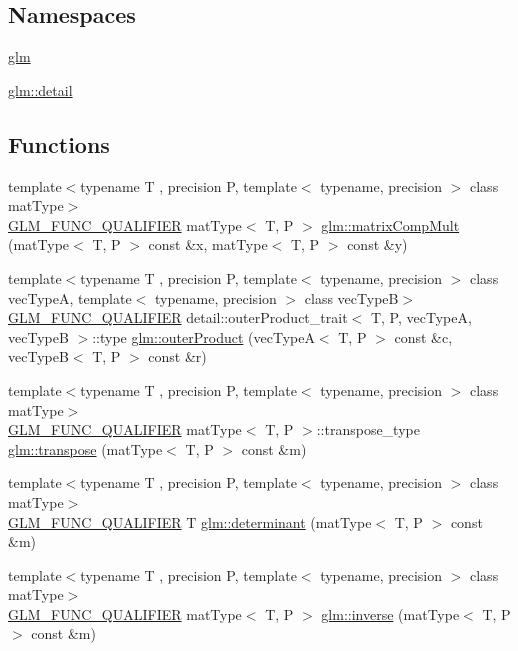\subsection*{Namespaces}
\begin{DoxyCompactItemize}
\item 
 \hyperlink{namespaceglm}{glm}
\item 
 \hyperlink{namespaceglm_1_1detail}{glm\+::detail}
\end{DoxyCompactItemize}
\subsection*{Functions}
\begin{DoxyCompactItemize}
\item 
{\footnotesize template$<$typename T , precision P, template$<$ typename, precision $>$ class mat\+Type$>$ }\\\hyperlink{setup_8hpp_a33fdea6f91c5f834105f7415e2a64407}{G\+L\+M\+\_\+\+F\+U\+N\+C\+\_\+\+Q\+U\+A\+L\+I\+F\+I\+ER} mat\+Type$<$ T, P $>$ \hyperlink{group__core__func__matrix_ga4a54992e4741188ee624b21e3ba91814}{glm\+::matrix\+Comp\+Mult} (mat\+Type$<$ T, P $>$ const \&x, mat\+Type$<$ T, P $>$ const \&y)
\item 
{\footnotesize template$<$typename T , precision P, template$<$ typename, precision $>$ class vec\+TypeA, template$<$ typename, precision $>$ class vec\+TypeB$>$ }\\\hyperlink{setup_8hpp_a33fdea6f91c5f834105f7415e2a64407}{G\+L\+M\+\_\+\+F\+U\+N\+C\+\_\+\+Q\+U\+A\+L\+I\+F\+I\+ER} detail\+::outer\+Product\+\_\+trait$<$ T, P, vec\+TypeA, vec\+TypeB $>$\+::type \hyperlink{group__core__func__matrix_gae9f513dc8e4f3ceb993669321b6d0f09}{glm\+::outer\+Product} (vec\+TypeA$<$ T, P $>$ const \&c, vec\+TypeB$<$ T, P $>$ const \&r)
\item 
{\footnotesize template$<$typename T , precision P, template$<$ typename, precision $>$ class mat\+Type$>$ }\\\hyperlink{setup_8hpp_a33fdea6f91c5f834105f7415e2a64407}{G\+L\+M\+\_\+\+F\+U\+N\+C\+\_\+\+Q\+U\+A\+L\+I\+F\+I\+ER} mat\+Type$<$ T, P $>$\+::transpose\+\_\+type \hyperlink{namespaceglm_a44eaf0309b3d7a9e71e31b5d4a8dbaab}{glm\+::transpose} (mat\+Type$<$ T, P $>$ const \&m)
\item 
{\footnotesize template$<$typename T , precision P, template$<$ typename, precision $>$ class mat\+Type$>$ }\\\hyperlink{setup_8hpp_a33fdea6f91c5f834105f7415e2a64407}{G\+L\+M\+\_\+\+F\+U\+N\+C\+\_\+\+Q\+U\+A\+L\+I\+F\+I\+ER} T \hyperlink{group__core__func__matrix_ga26ea77c574802bc6fc193c40478718d2}{glm\+::determinant} (mat\+Type$<$ T, P $>$ const \&m)
\item 
{\footnotesize template$<$typename T , precision P, template$<$ typename, precision $>$ class mat\+Type$>$ }\\\hyperlink{setup_8hpp_a33fdea6f91c5f834105f7415e2a64407}{G\+L\+M\+\_\+\+F\+U\+N\+C\+\_\+\+Q\+U\+A\+L\+I\+F\+I\+ER} mat\+Type$<$ T, P $>$ \hyperlink{group__core__func__matrix_ga7635d3dbe5aa10ff73a0e6903bf6bea5}{glm\+::inverse} (mat\+Type$<$ T, P $>$ const \&m)
\end{DoxyCompactItemize}
